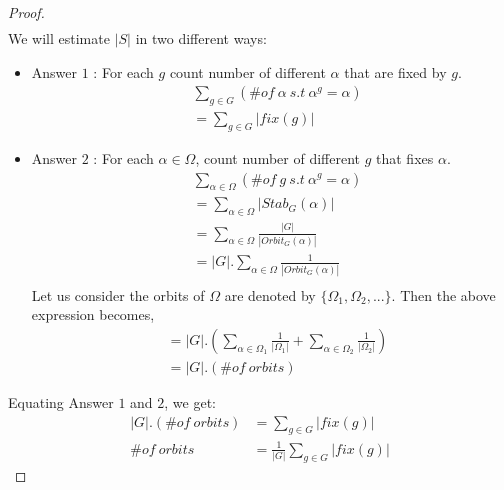 {\begin{proof}
\begin{align*}
\end{align*}
We will estimate $|S|$ in two different ways:
\begin{itemize}
\item Answer $1$ : For each $g$ count number of different $\alpha$ that are fixed by $g$.
\begin{align*}
&\sum_{g\in G} (\#of \ \alpha \ s.t \ \alpha^g=\alpha)\\
&=\sum_{g\in G}|fix(g)|
\end{align*}
\item Answer $2$ : For each $\alpha\in \Omega$, count number of different $g$ that fixes $\alpha$.
\begin{align*}
&\sum_{\alpha\in \Omega} (\#of \ g \ s.t \ \alpha^g=\alpha)\\
&=\sum_{\alpha\in \Omega}|Stab_G(\alpha)|\\
&=\sum_{\alpha\in \Omega}\frac{|G|}{|Orbit_G(\alpha)|}\\
&=|G|.\sum_{\alpha\in \Omega}\frac{1}{|Orbit_G(\alpha)|}\\
\end{align*}
Let us consider the orbits of $\Omega$ are denoted by $\{\Omega_1,\Omega_2,...\}$. Then the above expression becomes,
\begin{align*}
&=|G|.(\sum_{\alpha\in \Omega_1}\frac{1}{|\Omega_1|}+\sum_{\alpha\in \Omega_2}\frac{1}{|\Omega_2|} )\\
&=|G|.(\#of \ orbits)
\end{align*}
\end{itemize}
Equating Answer $1$ and $2$, we get:
\begin{align*}
|G|.(\#of \ orbits)&=\sum_{g\in G}|fix(g)|\\
\#of \ orbits&=\frac{1}{|G|}\sum_{g\in G}|fix(g)|
\end{align*}
\end{proof}
}
